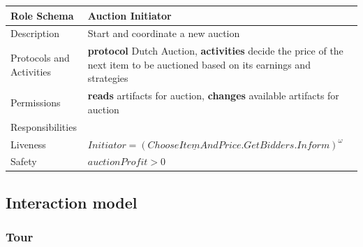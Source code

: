\documentclass[a4paper, 11pt]{article}
\begin{document}
\begin{table}[H]
	\label{my-label}
	\begin{tabular}{l p{7cm}}
		\hline
		Role Schema              & Auction Initiator \\
		\hline
		Description              & Start and coordinate a new auction \\
		Protocols and Activities & \textbf{protocol} Dutch Auction, \textbf{activities} decide the price of the next item to be auctioned based on its earnings and strategies \\
		Permissions              & \textbf{reads} artifacts for auction, \textbf{changes} available artifacts for auction \\
		\hline
		Responsibilities         &                   \\
		Liveness                 & \(Initiator=(\underline{ChooseItemAndPrice}.GetBidders.Inform)^\omega \) \\
		Safety                   & \(auctionProfit > 0  \) \\
		\hline
	\end{tabular}
\end{table}

\subsection{Interaction model}

\subsubsection{Tour}
\end{document}
